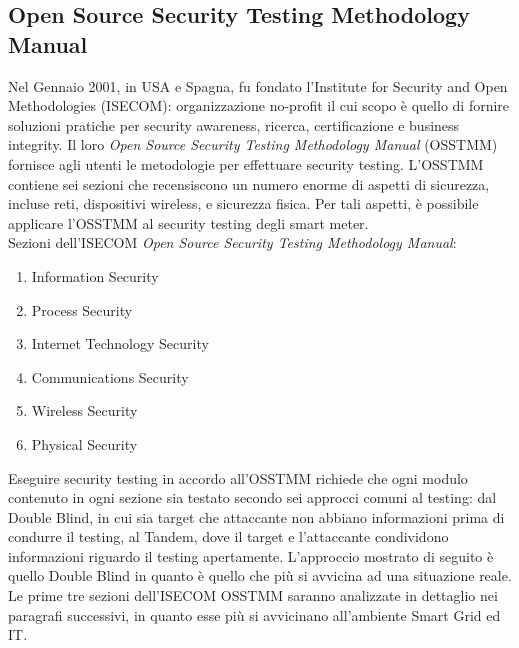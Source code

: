 \subsection{Open Source Security Testing Methodology Manual}
Nel Gennaio 2001, in USA e Spagna, fu fondato l'Institute for Security and Open Methodologies (ISECOM): organizzazione no-profit il cui scopo è quello di fornire soluzioni pratiche per security awareness, ricerca, certificazione e business integrity. Il loro \emph{Open Source Security Testing Methodology Manual} (OSSTMM) \cite{osstmm} fornisce agli utenti le metodologie per effettuare security testing. L'OSSTMM contiene sei sezioni che recensiscono un numero enorme di aspetti di sicurezza, incluse reti, dispositivi wireless, e sicurezza fisica. Per tali aspetti, è possibile applicare l'OSSTMM al security testing degli smart meter.\\
Sezioni dell'ISECOM \emph{Open Source Security Testing Methodology Manual}:
\begin{enumerate}
	\item Information Security
	\item Process Security
	\item Internet Technology Security
	\item Communications Security
	\item Wireless Security
	\item Physical Security
\end{enumerate}
Eseguire security testing in accordo all'OSSTMM richiede che ogni modulo contenuto in ogni sezione sia testato secondo sei approcci comuni al testing: dal Double Blind, in cui sia target che attaccante non abbiano informazioni prima di condurre il testing, al Tandem, dove il target e l'attaccante condividono informazioni riguardo il testing apertamente. L'approccio mostrato di seguito è quello Double Blind in quanto è quello che più si avvicina ad una situazione reale. Le prime tre sezioni dell'ISECOM OSSTMM saranno analizzate in dettaglio nei paragrafi successivi, in quanto esse più si avvicinano all'ambiente Smart Grid ed IT.

